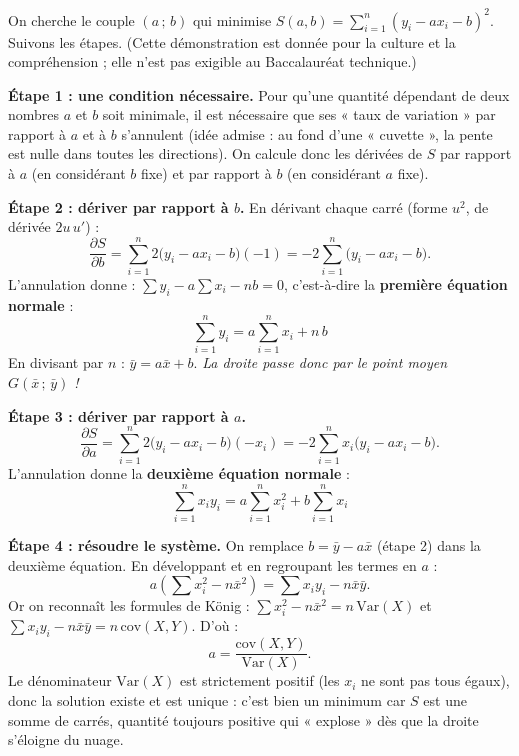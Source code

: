 \documentclass[11pt]{article}
\begin{document}
\begin{experience}
On cherche le couple $(a\,;\,b)$ qui minimise $S(a,b) = \sum_{i=1}^n (y_i - a x_i - b)^2$. Suivons les étapes. (Cette démonstration est donnée pour la culture et la compréhension ; elle n'est pas exigible au Baccalauréat technique.)

\textbf{Étape 1 : une condition nécessaire.} Pour qu'une quantité dépendant de deux nombres $a$ et $b$ soit minimale, il est nécessaire que ses « taux de variation » par rapport à $a$ et à $b$ s'annulent (idée admise : au fond d'une « cuvette », la pente est nulle dans toutes les directions). On calcule donc les dérivées de $S$ par rapport à $a$ (en considérant $b$ fixe) et par rapport à $b$ (en considérant $a$ fixe).

\textbf{Étape 2 : dériver par rapport à $b$.} En dérivant chaque carré (forme $u^2$, de dérivée $2u\,u'$) :
\[ \frac{\partial S}{\partial b} = \sum_{i=1}^n 2\bigl(y_i - a x_i - b\bigr)(-1) = -2\sum_{i=1}^n \bigl(y_i - a x_i - b\bigr). \]
L'annulation donne : $\sum y_i - a\sum x_i - n b = 0$, c'est-à-dire la \textbf{première équation normale} :
\[ \sum_{i=1}^n y_i = a\sum_{i=1}^n x_i + n\,b \]
En divisant par $n$ : $\bar{y} = a\bar{x} + b$. \emph{La droite passe donc par le point moyen $G(\bar{x}\,;\,\bar{y})$ !}

\textbf{Étape 3 : dériver par rapport à $a$.}
\[ \frac{\partial S}{\partial a} = \sum_{i=1}^n 2\bigl(y_i - a x_i - b\bigr)(-x_i) = -2\sum_{i=1}^n x_i\bigl(y_i - a x_i - b\bigr). \]
L'annulation donne la \textbf{deuxième équation normale} :
\[ \sum_{i=1}^n x_i y_i = a\sum_{i=1}^n x_i^2 + b\sum_{i=1}^n x_i \]

\textbf{Étape 4 : résoudre le système.} On remplace $b = \bar{y} - a\bar{x}$ (étape 2) dans la deuxième équation. En développant et en regroupant les termes en $a$ :
\[ a\left(\sum x_i^2 - n\bar{x}^2\right) = \sum x_i y_i - n\bar{x}\bar{y}. \]
Or on reconnaît les formules de König : $\sum x_i^2 - n\bar{x}^2 = n\,\mathrm{Var}(X)$ et $\sum x_i y_i - n\bar{x}\bar{y} = n\,\mathrm{cov}(X,Y)$. D'où :
\[ a = \frac{\mathrm{cov}(X,Y)}{\mathrm{Var}(X)}. \]
Le dénominateur $\mathrm{Var}(X)$ est strictement positif (les $x_i$ ne sont pas tous égaux), donc la solution existe et est unique : c'est bien un minimum car $S$ est une somme de carrés, quantité toujours positive qui « explose » dès que la droite s'éloigne du nuage.
\end{experience}
\end{document}
